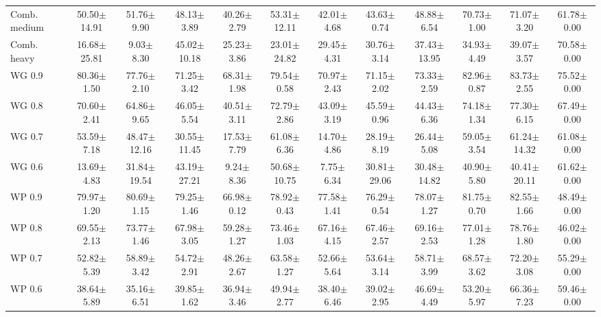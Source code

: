 \begin{table}[!t]
{\begin{tabular}{lccccccccccc}
Comb. medium & 50.50$\pm$14.91 & 51.76$\pm$9.90 & 48.13$\pm$3.89 & 40.26$\pm$2.79 & 53.31$\pm$12.11 & 42.01$\pm$4.68 & 43.63$\pm$0.74 & 48.88$\pm$6.54 & 70.73$\pm$1.00 & 71.07$\pm$3.20 & 61.78$\pm$0.00 \\
Comb. heavy & 16.68$\pm$25.81 & 9.03$\pm$8.30 & 45.02$\pm$10.18 & 25.23$\pm$3.86 & 23.01$\pm$24.82 & 29.45$\pm$4.31 & 30.76$\pm$3.14 & 37.43$\pm$13.95 & 34.93$\pm$4.49 & 39.07$\pm$3.57 & 70.58$\pm$0.00 \\
WG 0.9 & 80.36$\pm$1.50 & 77.76$\pm$2.10 & 71.25$\pm$3.42 & 68.31$\pm$1.98 & 79.54$\pm$0.58 & 70.97$\pm$2.43 & 71.15$\pm$2.02 & 73.33$\pm$2.59 & 82.96$\pm$0.87 & 83.73$\pm$2.55 & 75.52$\pm$0.00 \\
WG 0.8 & 70.60$\pm$2.41 & 64.86$\pm$9.65 & 46.05$\pm$5.54 & 40.51$\pm$3.11 & 72.79$\pm$2.86 & 43.09$\pm$3.19 & 45.59$\pm$0.96 & 44.43$\pm$6.36 & 74.18$\pm$1.34 & 77.30$\pm$6.15 & 67.49$\pm$0.00 \\
WG 0.7 & 53.59$\pm$7.18 & 48.47$\pm$12.16 & 30.55$\pm$11.45 & 17.53$\pm$7.79 & 61.08$\pm$6.36 & 14.70$\pm$4.86 & 28.19$\pm$8.19 & 26.44$\pm$5.08 & 59.05$\pm$3.54 & 61.24$\pm$14.32 & 61.08$\pm$0.00 \\
WG 0.6 & 13.69$\pm$4.83 & 31.84$\pm$19.54 & 43.19$\pm$27.21 & 9.24$\pm$8.36 & 50.68$\pm$10.75 & 7.75$\pm$6.34 & 30.81$\pm$29.06 & 30.48$\pm$14.82 & 40.90$\pm$5.80 & 40.41$\pm$20.11 & 61.62$\pm$0.00 \\
WP 0.9 & 79.97$\pm$1.20 & 80.69$\pm$1.15 & 79.25$\pm$1.46 & 66.98$\pm$0.12 & 78.92$\pm$0.43 & 77.58$\pm$1.41 & 76.29$\pm$0.54 & 78.07$\pm$1.27 & 81.75$\pm$0.70 & 82.55$\pm$1.66 & 48.49$\pm$0.00 \\
WP 0.8 & 69.55$\pm$2.13 & 73.77$\pm$1.46 & 67.98$\pm$3.05 & 59.28$\pm$1.27 & 73.46$\pm$1.03 & 67.16$\pm$4.15 & 67.46$\pm$2.57 & 69.16$\pm$2.53 & 77.01$\pm$1.28 & 78.76$\pm$1.80 & 46.02$\pm$0.00 \\
WP 0.7 & 52.82$\pm$5.39 & 58.89$\pm$3.42 & 54.72$\pm$2.91 & 48.26$\pm$2.67 & 63.58$\pm$1.27 & 52.66$\pm$5.64 & 53.64$\pm$3.14 & 58.71$\pm$3.99 & 68.57$\pm$3.62 & 72.20$\pm$3.08 & 55.29$\pm$0.00 \\
WP 0.6 & 38.64$\pm$5.89 & 35.16$\pm$6.51 & 39.85$\pm$1.62 & 36.94$\pm$3.46 & 49.94$\pm$2.77 & 38.40$\pm$6.46 & 39.02$\pm$2.95 & 46.69$\pm$4.49 & 53.20$\pm$5.97 & 66.36$\pm$7.23 & 59.46$\pm$0.00 \\
\hline
\end{tabular}}
\end{table}
